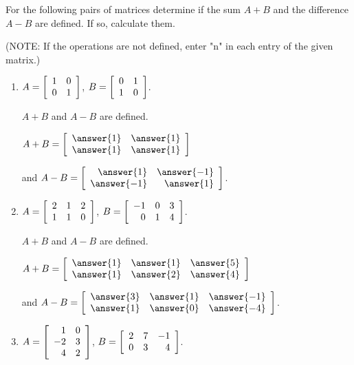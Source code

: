 \documentclass{ximera}
\author{Zack Reed}
\begin{document}
\begin{exercise}

  For the following pairs of matrices determine if the sum $A+B$
  and the difference $A-B$ are defined. If so, calculate them.

  (NOTE: If the operations are not defined, enter "n" in each entry of the given matrix.)

  \begin{enumerate}
  \item
    $A = \startmat{rr}
      1 & 0 \\
      0 & 1
    \stopmat$,\quad
    $B = \startmat{rr}
      0 & 1 \\
      1 & 0
    \stopmat$.

    $A+B$ and $A-B$ are  defined.
    
    $A + B = \startmat{rr}
      \answer{1} & \answer{1} \\
      \answer{1} & \answer{1}
    \stopmat$
  
    and $A - B = \startmat{rr}
      \answer{1} & \answer{-1} \\
      \answer{-1} & \answer{1}
    \stopmat$.

  \item %
    $A = \startmat{rrr}
      2 & 1 & 2 \\
      1 & 1 & 0
    \stopmat$,\quad
    $B = \startmat{rrr}
      -1 & 0 & 3 \\
      0 & 1 & 4
    \stopmat$.

    $A+B$ and $A-B$ are  defined.

    $A + B = \startmat{rrr}
      \answer{1} & \answer{1} & \answer{5} \\
      \answer{1} & \answer{2} & \answer{4}
    \stopmat$

    and $A - B = \startmat{rrr}
      \answer{3} & \answer{1} & \answer{-1} \\
      \answer{1} & \answer{0} & \answer{-4}
    \stopmat$.

  \item %
    $A = \startmat{rr}
      1 & 0 \\
      -2 & 3 \\
      4 & 2
    \stopmat$,\quad
    $B = \startmat{rrr}
      2 & 7 & -1 \\
      0 & 3 & 4
    \stopmat$.


\end{enumerate}
\end{exercise}
\end{document}
